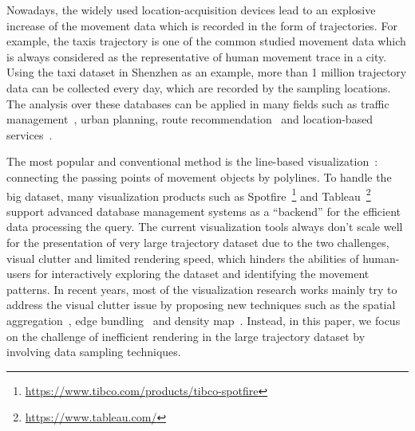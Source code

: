 Nowadays, the widely used location-acquisition devices lead to an explosive increase of the movement data which is recorded in the form of trajectories. 
For example, the taxis trajectory is one of the common studied movement data which is always considered as the representative of human movement trace in a city. Using the taxi dataset in Shenzhen as an example, more than 1 million trajectory data can be collected every day, which are recorded by the sampling locations.
The analysis over these databases can be applied in many fields such as traffic management~\cite{wang2014visual}, urban planning, route recommendation~\cite{zheng2011learning} and location-based services~\cite{liu2016smartadp, zheng2010collaborative}. 

The most popular and conventional method is the line-based visualization~\cite{chen2015survey}: connecting the passing points of movement objects by polylines. 
To handle the big dataset, many visualization products such as Spotfire~\footnote{\url{https://www.tibco.com/products/tibco-spotfire}} and Tableau~\footnote{\url{https://www.tableau.com/}} support advanced database management systems as a ``backend'' for the efficient data processing the query. 
The current visualization tools always don't scale well for the presentation of very large trajectory dataset due to the two challenges, visual clutter and limited rendering speed, which hinders the abilities of human-users for interactively exploring the dataset and identifying the movement patterns. 
In recent years, most of the visualization research works mainly try to address the visual clutter issue by proposing new techniques such as the spatial aggregation~\cite{zeng2013visualizing, von2015mobilitygraphs}, edge bundling~\cite{zeng2019route, thony2015vector} and density map~\cite{lampe2011interactive, scheepens2011interactive}. Instead, in this paper, we focus on the challenge of inefficient rendering in the large trajectory dataset by involving data sampling techniques. 

